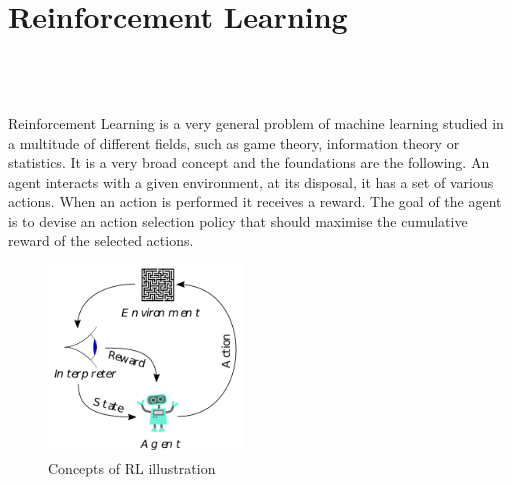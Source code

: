 
\setcounter{chapter}{1}

\chapter{Reinforcement Learning}
\mbox{}\\
\mbox{}\\
\mbox{}\\
Reinforcement Learning \cite{kaelbling1996reinforcement} is a very general problem of machine learning studied in a multitude of different fields, such as game theory, information theory or statistics. It is a very broad concept and the foundations are the following. An agent interacts with a given environment, at its disposal, it has a set of various actions. When an action is performed it receives a reward. The goal of the agent is to devise an action selection policy that should maximise the cumulative reward of the selected actions.

\begin{figure}[h]
	\begin{center}
		\includegraphics*[height=5cm]{figures/rl_broad.png}
		\caption{ Concepts of RL illustration \protect\cite{wiki:rl}}	
	\end{center}
\end{figure}

